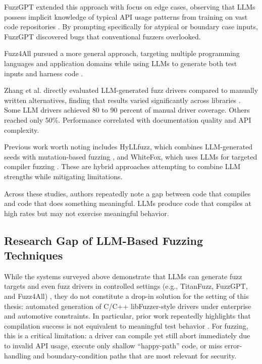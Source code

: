 FuzzGPT extended this approach with focus on edge cases, observing that LLMs possess implicit knowledge of typical API usage patterns from training on vast code repositories \cite{FuzzGPT2023}. By prompting specifically for atypical or boundary case inputs, FuzzGPT discovered bugs that conventional fuzzers overlooked.

Fuzz4All pursued a more general approach, targeting multiple programming languages and application domains while using LLMs to generate both test inputs and harness code \cite{Fuzz4All2023}.

Zhang et al. directly evaluated LLM-generated fuzz drivers compared to manually written alternatives, finding that results varied significantly across libraries \cite{LLMDriverGenEffectiveness2023}. Some LLM drivers achieved 80 to 90 percent of manual driver coverage. Others reached only 50\%. Performance correlated with documentation quality and API complexity.

Previous work worth noting includes HyLLfuzz, which combines LLM-generated seeds with mutation-based fuzzing \cite{HyLLfuzz2024}, and WhiteFox, which uses LLMs for targeted compiler fuzzing \cite{WhiteFox2023}. These are hybrid approaches attempting to combine LLM strengths while mitigating limitations.

Across these studies, authors repeatedly note a gap between code that compiles and code that does something meaningful. LLMs produce code that compiles at high rates but may not exercise meaningful behavior.

\subsection{Research Gap of LLM-Based Fuzzing Techniques}
\label{sec:lit_llm_fuzzing_gap}

While the systems surveyed above demonstrate that LLMs can generate fuzz targets and even fuzz drivers in controlled settings (e.g., TitanFuzz, FuzzGPT, and Fuzz4All) \cite{TitanFuzz2022, FuzzGPT2023, Fuzz4All2023}, they do not constitute a drop-in solution for the setting of this thesis: automated generation of C/C++ libFuzzer-style drivers under enterprise and automotive constraints. In particular, prior work repeatedly highlights that compilation success is not equivalent to meaningful test behavior \cite{LLMDriverGenEffectiveness2023}. For fuzzing, this is a critical limitation: a driver can compile yet still abort immediately due to invalid API usage, execute only shallow ``happy-path'' code, or miss error-handling and boundary-condition paths that are most relevant for security.

